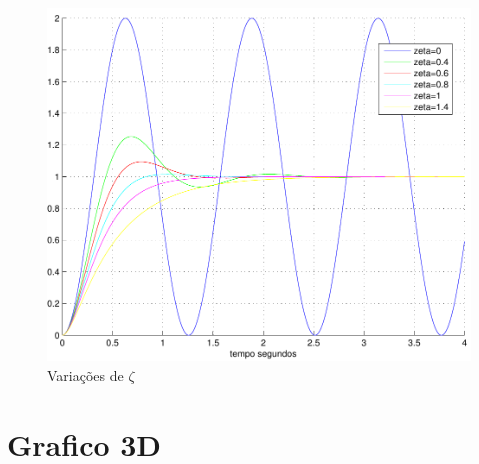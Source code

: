 \documentclass[paper=a4, fontsize=11pt]{article}
\begin{document}
\begin{figure}
    \begin{center}
    \includegraphics[scale=.5]{q1ib.pdf}
    \caption{Variações de $\zeta$}
    \end{center}
\end{figure}

\section{Grafico 3D}
\end{document}
